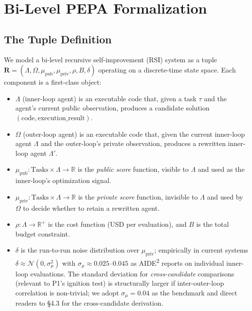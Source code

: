 \documentclass{article}
\theoremstyle{definition}
\begin{document}
\section{Bi-Level PEPA Formalization}

\subsection{The Tuple Definition}

We model a bi-level recursive self-improvement (RSI) system as a tuple $\mathbf{R} = (\Lambda, \Omega, \mu_{\text{pub}}, \mu_{\text{priv}}, \rho, B, \delta)$ operating on a discrete-time state space. Each component is a first-class object:

\begin{itemize}
    \item $\Lambda$ (inner-loop agent) is an executable code that, given a task $\tau$ and the agent's current public observation, produces a candidate solution $(\text{code}, \text{execution\_result})$.
    \item $\Omega$ (outer-loop agent) is an executable code that, given the current inner-loop agent $\Lambda$ and the outer-loop's private observation, produces a rewritten inner-loop agent $\Lambda'$.
    \item $\mu_{\text{pub}} : \text{Tasks} \times \Lambda \to \mathbb{R}$ is the \textit{public score} function, visible to $\Lambda$ and used as the inner-loop's optimization signal.
    \item $\mu_{\text{priv}} : \text{Tasks} \times \Lambda \to \mathbb{R}$ is the \textit{private score} function, invisible to $\Lambda$ and used by $\Omega$ to decide whether to retain a rewritten agent.
    \item $\rho : \Lambda \to \mathbb{R}^+$ is the cost function (USD per evaluation), and $B$ is the total budget constraint.
    \item $\delta$ is the run-to-run noise distribution over $\mu_{\text{priv}}$; empirically in current systems $\delta \approx \mathcal{N}(0, \sigma^2_\mu)$ with $\sigma_\mu \approx 0.025$--$0.045$ as AIDE\textsuperscript{2} reports on individual inner-loop evaluations. The standard deviation for \textit{cross-candidate} comparisons (relevant to P1's ignition test) is structurally larger if inter-outer-loop correlation is non-trivial; we adopt $\sigma_\mu = 0.04$ as the benchmark and direct readers to \S4.3 for the cross-candidate derivation.
\end{itemize}
\end{document}
